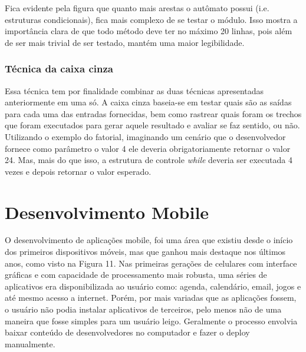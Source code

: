 \documentclass[
    12pt,       %
    openright,      %
    twoside,      %
    a4paper,      %
    english,      %
    french,       %
    spanish,      %
    brazil,       %
    ]{abntex2}
\begin{document}
              Fica evidente pela figura que quanto mais arestas o autômato possui (i.e. estruturas
              condicionais), fica mais complexo de se testar o módulo. Isso mostra a importância clara de
              que todo método deve ter no máximo 20 linhas, pois além de ser mais trivial de ser testado,
              mantém uma maior legibilidade.

          \subsection{Técnica da caixa cinza}
              Essa técnica tem por finalidade combinar as duas técnicas apresentadas anteriormente em uma
              só. A caixa cinza baseia-se em testar quais são as saídas para cada uma das entradas
              fornecidas, bem como rastrear quais foram os trechos que foram executados para gerar aquele
              resultado e avaliar se faz sentido, ou não. Utilizando o exemplo do fatorial, imaginando
              um cenário que o desenvolvedor fornece como parâmetro o valor 4 ele deveria obrigatoriamente
              retornar o valor 24. Mas, mais do que isso, a estrutura de controle \textit{while} deveria
              ser executada 4 vezes e depois retornar o valor esperado.

  \chapter{Desenvolvimento Mobile}

      O desenvolvimento de aplicações mobile, foi uma área que existiu desde o início dos
      primeiros dispositivos móveis, mas que ganhou mais destaque nos últimos anos, como visto na
      Figura 11. Nas primeiras gerações de celulares com interface gráficas e com capacidade
      de processamento mais robusta, uma séries de aplicativos era disponibilizada ao usuário como:
      agenda, calendário, email, jogos e até mesmo acesso a internet. Porém, por mais variadas que as
      aplicações fossem, o usuário não podia instalar aplicativos de terceiros, pelo menos não de uma
      maneira que fosse simples para um usuário leigo. Geralmente o processo envolvia baixar
      conteúdo de desenvolvedores no computador e fazer o deploy manualmente.
\end{document}
